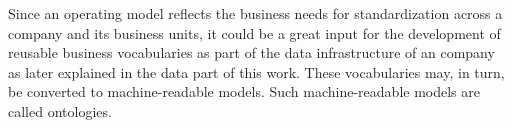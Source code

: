 %
%
Since an operating model reflects the business needs for standardization across a company and its business units,
it could be a great input for the development of reusable business vocabularies as part of the data infrastructure
of an company as later explained in the data part of this work.
These vocabularies may, in turn, be converted to machine-readable models.
Such machine-readable models are called ontologies.
